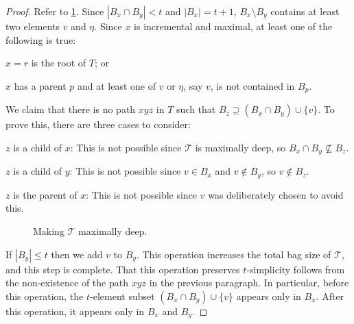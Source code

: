 \documentclass[kpfonts]{patmorin}
\theoremstyle{named}
\begin{document}
\begin{proof}
    Refer to \cref{tough-one}.
    Since $|B_x\cap B_y|< t$ and $|B_x|=t+1$, $B_x\setminus B_y$ contains at least two elements $v$ and $\eta$.  Since $x$ is incremental and maximal, at least one of the following is true:
    \begin{inparaenum}[(i)]
        \item $x=r$ is the root of $T$; or
        \item $x$ has a parent $p$ and at least one of $v$ or $\eta$, say $v$, is not contained in $B_p$.
    \end{inparaenum}
    We claim that there is no path $xyz$ in $T$ such that $B_z\supseteq (B_x\cap B_y)\cup\{v\}$. To prove this, there are three cases to consider:
    \begin{compactenum}
        \item $z$ is a child of $x$:  This is not possible since $\mathcal{T}$ is maximally deep, so $B_x\cap B_y\not\subseteq B_z$.
        \item $z$ is a child of $y$:  This is not possible since $v\in B_x$ and $v\not\in B_y$, so $v\not\in B_z$.
        \item $z$ is the parent of $x$:  This is not possible since $v$ was deliberately chosen to avoid this.
    \end{compactenum}
    \begin{figure}
        \caption{Making $\mathcal{T}$ maximally deep.}
        \label{tough-one}
    \end{figure}


    If $|B_y|\le t$ then we add $v$ to $B_y$.  This operation increases the total bag size of $\mathcal{T}$, and this step is complete.  That this operation preserves $t$-simplicity follows from the non-existence of the path $xyz$ in the previous paragraph.  In particular, before this operation, the $t$-element subset $(B_x\cap B_y)\cup\{v\}$ appears only in $B_x$. After this operation, it appears only in $B_x$ and $B_y$.


\end{proof}
\end{document}
